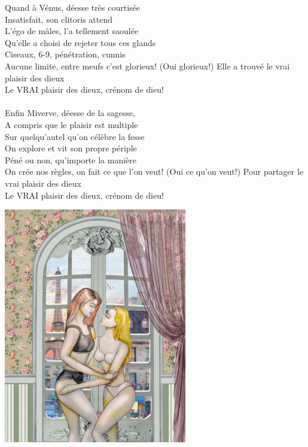 \breakpage
Quand à Vénus, déesse très courtisée
\\Insatisfait, son clitoris attend
\\L'égo de mâles, l'a tellement saoulée
\\Qu'elle a choisi de rejeter tous ces glands
\\Ciseaux, 6-9, pénétration, cunnis
\\Aucune limite, entre meufs c'est glorieux! (Oui glorieux!)
{Elle a trouvé le vrai plaisir des dieux  ~~~~~~~}
\\Le VRAI plaisir des dieux, crénom de dieu!
\\\\Enfin Miverve, déesse de la sagesse,
\\A compris que le plaisir est multiple
\\Sur quelqu'autel qu'on célèbre la fesse
\\On explore et vit son propre périple
\\Péné ou non, qu'importe la manière
\\On crée nos règles, on fait ce que l'on veut! (Oui ce qu'on veut!)
{Pour partager le vrai plaisir des dieux  ~~~~~~~}
\\Le VRAI plaisir des dieux, crénom de dieu!
\\
\begin{center}
   \includegraphics[width=0.6\textwidth]{images/brev76.png}
 \end{center}

\breakpage